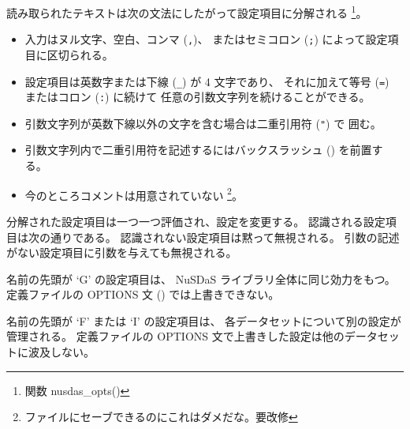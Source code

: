 読み取られたテキストは次の文法にしたがって設定項目に分解される%
\footnote{関数 nusdas\_opts()}。
\begin{itemize}
\item{} 入力はヌル文字、空白、コンマ ({\tt,})、
	またはセミコロン ({\tt;})
	によって設定項目に区切られる。
\item{}	設定項目は英数字または下線 ({\tt \_}) が 4 文字であり、
	それに加えて等号 ({\tt =}) またはコロン ({\tt :}) に続けて
	任意の引数文字列を続けることができる。
\item{} 引数文字列が英数下線以外の文字を含む場合は二重引用符 ({\tt "}) で
	囲む。
\item{} 引数文字列内で二重引用符を記述するにはバックスラッシュ
	({\tt \BACKSLASH}) を前置する。
\item{}	今のところコメントは用意されていない%
	\footnote{ファイルにセーブできるのにこれはダメだな。要改修}。
\end{itemize}

分解された設定項目は一つ一つ評価され、設定を変更する。
認識される設定項目は次の通りである。
認識されない設定項目は黙って無視される。
引数の記述がない設定項目に引数を与えても無視される。

名前の先頭が `G' の設定項目は、
NuSDaS ライブラリ全体に同じ効力をもつ。
定義ファイルの OPTIONS 文 () では上書きできない。

名前の先頭が `F' または `I' の設定項目は、
各データセットについて別の設定が管理される。
定義ファイルの OPTIONS 文で上書きした設定は他のデータセットに波及しない。

